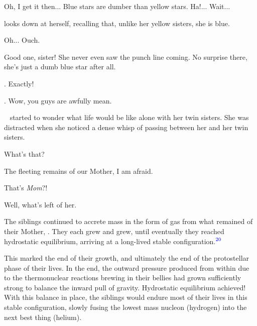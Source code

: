 \documentclass[main.tex]{subfiles}
\begin{document}
\par \Celaeno Oh, I get it then...  Blue stars are dumber than yellow stars.  Ha!...  Wait...

\par \nar \rmcelaeno looks down at herself, recalling that, unlike her yellow sisters, she is blue.

\par \Celaeno Oh...  Ouch.

\par \Alcyone Good one, sister!  She never even saw the punch line coming.  No surprise there, she's just a dumb blue star after all.

\par \Taygete. Exactly!

\par \Celaeno. Wow, you guys are awfully mean.

\par \nar \rmcelaeno~ started to wonder what life would be like alone with her twin sisters.  She was distracted when she noticed a dense whisp of \rmpleione passing between her and her twin sisters.  

\par \Celaeno What's that?

\par \Maia The fleeting remains of our Mother, I am afraid.

\par \Electra That's \textit{Mom}?!

\par \Maia Well, what's left of her.

\par \nar The siblings continued to accrete mass in the form of gas from what remained of their Mother, \rmpleione.  They each grew and grew, until eventually they reached hydrostatic equilibrium, arriving at a long-lived stable configuration.$^{\textcolor{blue}{20}}$  

\par \nar This marked the end of their growth, and ultimately the end of the protostellar phase of their lives.  In the end, the outward pressure produced from within due to the thermonuclear reactions brewing in their bellies had grown sufficiently strong to balance the inward pull of gravity.  Hydrostatic equilibrium achieved!  With this balance in place, the siblings would endure most of their lives in this stable configuration, slowly fusing the lowest mass nucleon (hydrogen) into the next best thing (helium).
\end{document}
